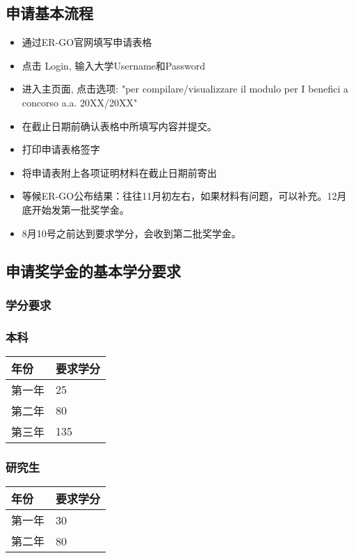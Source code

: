 \subsection{申请基本流程}
\begin{itemize}
 \item 通过ER-GO官网填写申请表格
 \item 点击 Login, 输入大学Username和Password
 \item 进入主页面, 点击选项: "per compilare/visualizzare il modulo per I benefici a concorso a.a.
20XX/20XX"
 \item 在截止日期前确认表格中所填写内容并提交。
 \item 打印申请表格签字 
 \item 将申请表附上各项证明材料在截止日期前寄出 
 \item 等候ER-GO公布结果：往往11月初左右，如果材料有问题，可以补充。12月底开始发第一批奖学金。
 \item 8月10号之前达到要求学分，会收到第二批奖学金。
\end{itemize}

\subsection{申请奖学金的基本学分要求}

\subsubsection{学分要求}

\subsubsection{本科}
\begin{tabularx}{\textwidth}{ |X|X| }
  \hline
  年份 & 要求学分\\
  \hline 
  第一年  & 25  \\
  第二年  & 80  \\
  第三年  & 135  \\
  \hline
\end{tabularx}



\subsubsection{研究生}
\begin{tabularx}{\textwidth}{ |X|X| }
  \hline
  年份 & 要求学分\\
  \hline 
  第一年  & 30  \\
  第二年  & 80  \\
  \hline
\end{tabularx}


